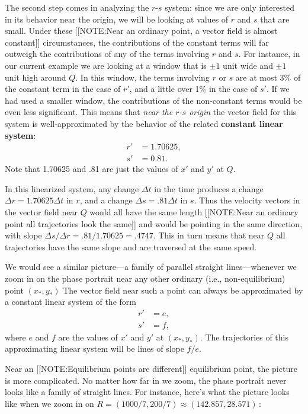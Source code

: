 The second step comes in analyzing the $r$-$s$ system: since we are
only interested in its behavior near the origin, we will be looking at
values of $r$ and $s$ that are small.  Under these
[[NOTE:Near an ordinary point, a vector field is  almost constant]]
circumstances, the contributions of the constant terms will far
outweigh the contributions of any of the terms involving $r$ and $s$.
For instance, in our current example we are looking at a window that
is $\pm 1$ unit wide and $\pm 1$ unit high around $Q$. In this window,
the terms involving $r$ or $s$ are at most 3\% of the constant term in
the case of $r'$, and a little over 1\% in the case of $s'$. If we had
used a smaller window, the contributions of the non-constant terms
would be even less significant.  This means that {\em near the $r$-$s$
  origin\/} the vector field for this system is well-approximated by
the behavior of the related {\bf constant linear system}:
\begin{align*}
r' &= 1.70625, \\
s' &= 0.81.
\end{align*}
Note that 1.70625 and .81 are just the values of $x'$ and $y'$ at $Q$. 

In this linearized system, any change $\Delta t$ in the time produces
a change $\Delta r =1.70625\Delta t$ in $r$, and a change $\Delta
s=.81\Delta t$ in $s$. Thus the velocity vectors in the vector field
near $Q$ would all have the same length
[[NOTE:Near an ordinary point all trajectories look  the same]]
and would be pointing in the same direction, with slope $\Delta
s/\Delta r =.81/1.70625=.4747$. This in turn means that near $Q$
all trajectories have the same slope and are traversed at the same
speed.

We would see a similar picture---a family of parallel straight
lines---whenever we zoom in on the phase portrait near any other
ordinary (i.e., non-equilibrium) point $(x_\ast, y_\ast)$ The vector
field near such a point can always be approximated by a constant
linear system of the form
\begin{align*}
r' &= e, \\
s' &= f,
\end{align*}
where $e$ and $f$ are the values of $x'$ and $y'$ at $(x_\ast,
y_\ast)$.  The trajectories of this approximating linear system will
be lines of slope $f/e$.

Near an 
[[NOTE:Equilibrium points  are different]]
equilibrium point, the picture is more complicated.  No matter how far
in we zoom, the phase portrait never looks like a family of straight
lines.  For instance, here's what the picture looks like when we zoom
in on $R=(1000/7, 200/7)\approx (142.857, 28.571)$\,:

